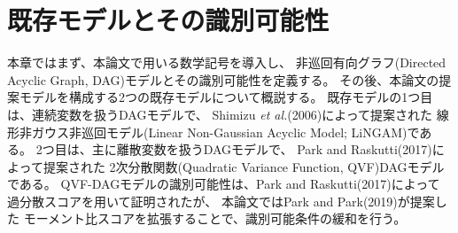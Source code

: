 
\section{既存モデルとその識別可能性}
\label{part:model}

本章ではまず、本論文で用いる数学記号を導入し、
非巡回有向グラフ(Directed Acyclic Graph, DAG)モデルとその識別可能性を定義する。
その後、本論文の提案モデルを構成する2つの既存モデルについて概説する。
既存モデルの1つ目は、連続変数を扱うDAGモデルで、
Shimizu \textit{et al.}(2006)\cite{Shimizu2006-yu}によって提案された
線形非ガウス非巡回モデル(Linear Non-Gaussian Acyclic Model; LiNGAM)である。
2つ目は、主に離散変数を扱うDAGモデルで、
Park and Raskutti(2017)\cite{Park2017-hw}によって提案された
2次分散関数(Quadratic Variance Function, QVF)DAGモデルである。
QVF-DAGモデルの識別可能性は、Park and Raskutti(2017)\cite{Park2017-hw}によって
過分散スコアを用いて証明されたが、
本論文ではPark and Park(2019)\cite{Park2019-qy}が提案した
モーメント比スコアを拡張することで、識別可能条件の緩和を行う。


%

%

%

%

%

